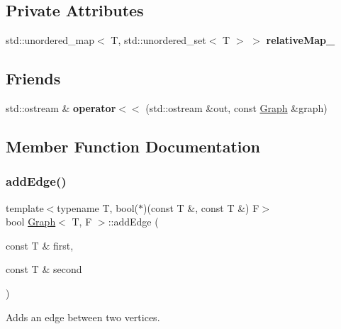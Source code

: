 \subsection*{Private Attributes}
\begin{DoxyCompactItemize}
\item 
\mbox{\label{class_graph_a949a8e9a754adedac0e83bce9e97d392}} 
std\+::unordered\+\_\+map$<$ T, std\+::unordered\+\_\+set$<$ T $>$ $>$ {\bfseries relative\+Map\+\_\+}
\end{DoxyCompactItemize}
\subsection*{Friends}
\begin{DoxyCompactItemize}
\item 
\mbox{\label{class_graph_a8c95b2eba4c48f2610a84160fa6871f2}} 
std\+::ostream \& {\bfseries operator$<$$<$} (std\+::ostream \&out, const \hyperlink{class_graph}{Graph} \&graph)
\end{DoxyCompactItemize}


\subsection{Member Function Documentation}
\mbox{\label{class_graph_ae68a4a6bcb5dacf54f389ec9f28eb9e7}} 
\subsubsection{\texorpdfstring{add\+Edge()}{addEdge()}}
{\footnotesize\ttfamily template$<$typename T, bool($\ast$)(const T \&, const T \&) F$>$ \\
bool \hyperlink{class_graph}{Graph}$<$ T, F $>$\+::add\+Edge (\begin{DoxyParamCaption}\item[{const T \&}]{first,  }\item[{const T \&}]{second }\end{DoxyParamCaption})}



Adds an edge between two vertices. 


